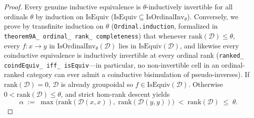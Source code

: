 \begin{proof}
Every genuine inductive equivalence is $\theta$-inductively invertible for all ordinals $\theta$ by induction on $\mathrm{IsEquiv}$ ($\mathrm{IsEquiv} \subseteq \mathrm{IsOrdinalInv}_\theta$). Conversely, we prove by transfinite induction on $\theta$ (\texttt{Ordinal.induction}, formalized in \texttt{theorem9A\_ ordinal\_ rank\_ completeness}) that whenever $\mathrm{rank}(\mathcal{D}) \le \theta$, every $f : x \to y$ in $\mathrm{IsOrdinalInv}_\theta(\mathcal{D})$ lies in $\mathrm{IsEquiv}(\mathcal{D})$, and likewise every coinductive equivalence is inductively invertible at every ordinal rank (\texttt{ranked\_ coindEquiv\_ iff\_ isEquiv}---in particular, no non-invertible cell in an ordinal-ranked category can ever admit a coinductive bisimulation of pseudo-inverses). If $\mathrm{rank}(\mathcal{D}) = 0$, $\mathcal{D}$ is already groupoidal so $f \in \mathrm{IsEquiv}(\mathcal{D})$. Otherwise $0 < \mathrm{rank}(\mathcal{D}) \le \theta$, and strict hom-rank descent yields
\[
  \alpha \;:=\; \max\bigl(\mathrm{rank}(\mathcal{D}(x, x)),\; \mathrm{rank}(\mathcal{D}(y, y))\bigr) \;<\; \mathrm{rank}(\mathcal{D}) \;\le\; \theta.
\]

\end{proof}
